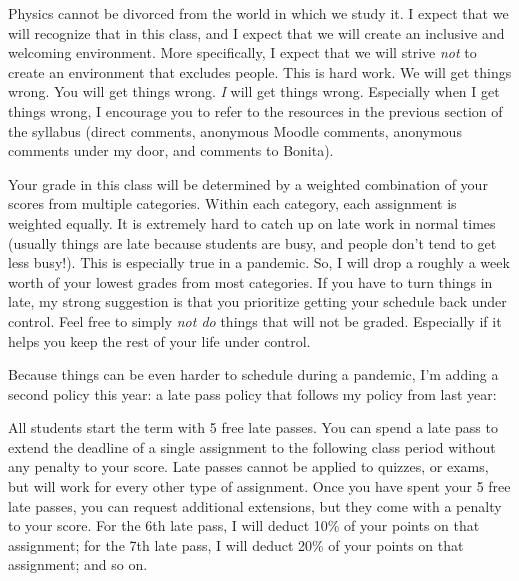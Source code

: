 \documentclass[12pt]{article}
\begin{document}
{\begin{description}
        Physics cannot be divorced from the world in which we study it. I
        expect that we will recognize that in this class, and I expect
        that we will create an inclusive and welcoming
        environment. More specifically, I expect that we will strive
        \textit{not} to create an environment that excludes
        people. This is hard work. We will get things wrong. You will
        get things wrong. \textit{I} will get things wrong. Especially
        when I get things wrong, I encourage you to refer to the
        resources in the previous section of the syllabus (direct
        comments, anonymous Moodle comments, anonymous comments under
        my door, and comments to Bonita).

        \newpage

  \item[Grading Policy and Late Policy:]
        Your grade in this class will be determined by a weighted
        combination of your scores from multiple categories. Within
        each category, each assignment is weighted equally. It is
        extremely hard to catch up on late work in normal times
        (usually things are late because students are busy, and people
        don't tend to get less busy!). This is especially true in a
        pandemic. So, I will drop a roughly a week worth of your
        lowest grades from most categories. If you have to turn things
        in late, my strong suggestion is that you prioritize getting
        your schedule back under control. Feel free to simply
        \textit{not do} things that will not be graded. Especially if
        it helps you keep the rest of your life under control.

        Because things can be even harder to schedule during a
        pandemic, I'm adding a second policy this year: a late pass
        policy that follows my policy from last year:

        All students start the term with 5 free late
        passes. You can spend a late pass to extend the deadline of a
        single assignment to the following class period without any
        penalty to your score. Late passes cannot be applied to
        quizzes, or exams, but will work for
        every other type of assignment. Once you have spent your 5
        free late passes, you can request additional extensions, but
        they come with a penalty to your score. For the 6th late pass,
        I will deduct 10\% of your points on that assignment; for the
        7th late pass, I will deduct 20\% of your points on that
        assignment; and so on.
        

\end{description}}
\end{document}
